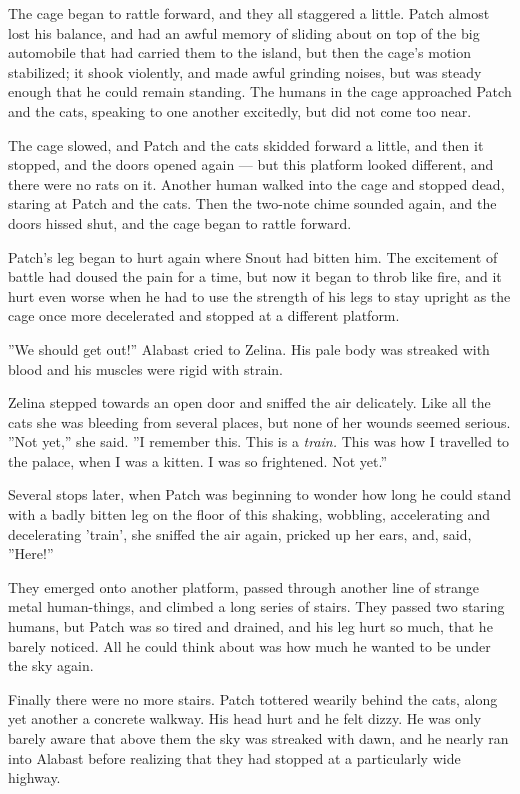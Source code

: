 \documentclass[12pt]{book}
\begin{document}
The cage began to rattle forward, and they all staggered a
little. Patch almost lost his balance, and had an awful memory of
sliding about on top of the big automobile that had carried them to
the island, but then the cage's motion stabilized; it shook violently,
and made awful grinding noises, but was steady enough that he could
remain standing. The humans in the cage approached Patch and the cats,
speaking to one another excitedly, but did not come too near.

The cage slowed, and Patch and the cats skidded forward a little, and
then it stopped, and the doors opened again --- but this platform
looked different, and there were no rats on it. Another human walked
into the cage and stopped dead, staring at Patch and the cats. Then
the two-note chime sounded again, and the doors hissed shut, and the
cage began to rattle forward.

Patch's leg began to hurt again where Snout had bitten him. The
excitement of battle had doused the pain for a time, but now it began
to throb like fire, and it hurt even worse when he had to use the
strength of his legs to stay upright as the cage once more decelerated
and stopped at a different platform.

''We should get out!'' Alabast cried to Zelina. His pale body was
streaked with blood and his muscles were rigid with strain.

Zelina stepped towards an open door and sniffed the air
delicately. Like all the cats she was bleeding from several places,
but none of her wounds seemed serious. ''Not yet,'' she said. ''I
remember this. This is a \textit{train.} This was how I travelled to
the palace, when I was a kitten. I was so frightened. Not yet.''

Several stops later, when Patch was beginning to wonder how long he
could stand with a badly bitten leg on the floor of this shaking,
wobbling, accelerating and decelerating 'train', she sniffed the air
again, pricked up her ears, and, said, ''Here!''

They emerged onto another platform, passed through another line of
strange metal human-things, and climbed a long series of stairs. They
passed two staring humans, but Patch was so tired and drained, and his
leg hurt so much, that he barely noticed. All he could think about was
how much he wanted to be under the sky again.

Finally there were no more stairs. Patch tottered wearily behind the
cats, along yet another a concrete walkway. His head hurt and he felt
dizzy. He was only barely aware that above them the sky was streaked
with dawn, and he nearly ran into Alabast before realizing that they
had stopped at a particularly wide highway.
\end{document}
